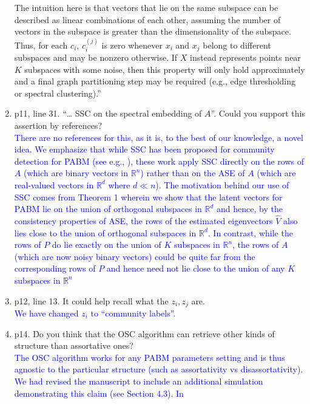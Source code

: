\documentclass[
]{article}
\begin{document}
\begin{enumerate}
{  The intuition here is that vectors that lie on the same subspace can
  be described as linear combinations of each other, assuming the number
  of vectors in the subspace is greater than the dimensionality of the
  subspace. Thus, for each $c_i$, $c_i^{(j)}$ is zero whenever $x_i$ and $x_j$ belong to different subspaces and may be nonzero otherwise. If \(X\) instead represents points near \(K\) subspaces with some noise, 
  then this property will only hold approximately and 
  a final graph partitioning step may be required 
  (e.g., edge thresholding or spectral clustering).''
  }
\item
  p11, line 31. ``\ldots{} SSC on the spectral embedding of \(A\)''.
  Could you support this assertion by references?\\
  \textcolor{blue}{
  There are no references for this, as it is, to the best of our knowledge, a novel idea. 
  We emphasize that while SSC has been proposed for community detection
  for PABM (see e.g., \citep{noroozi2019estimation}), these work apply SSC
  directly on the rows of $A$ (which are binary vectors in
  $\mathbb{R}^{n}$) rather than on the ASE of $A$ (which are real-valued
  vectors in $\mathbb{R}^{d}$ where $d \ll n$). The motivation behind
  our use of SSC comes  from Theorem 1 wherein we show that the latent
  vectors for PABM lie on the union of orthogonal subspaces in $\mathbb{R}^{d}$ and hence,
  by the consistency properties of ASE, the rows of the estimated
  eigenvectors $\hat{V}$ also lies close to the union of orthogonal
  subspaces in $\mathbb{R}^{d}$. In contrast, while the rows of $P$ do lie exactly on the
  union of $K$ subspaces in $\mathbb{R}^{n}$, the rows of $A$
  (which are now noisy binary vectors) could be quite far from the
  corresponding rows of $P$ and hence need not lie close to the union
  of any $K$ subspaces in $\mathbb{R}^{n}$ 
  }
\item
  p12, line 13. It could help recall what the \(z_i, z_j\) are.\\
  \textcolor{blue}{
  We have changed $z_i$ to ``community labels''.
  }
\item
  p14. Do you think that the OSC algorithm can retrieve other kinds of
  structure than assortative ones?\\
  \textcolor{blue}{
  The OSC algorithm works for any PABM parameters setting and is thus
  agnostic to the particular structure (such as assortativity vs
  disassortativity). We had revised the manuscript to include an
  additional simulation demonstrating this claim (see Section 4.3). In
}
\end{enumerate}
\end{document}
